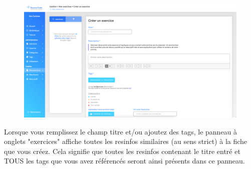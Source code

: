 \begin{figure}[H]
    \includegraphics[width=\textwidth,height=\textheight,keepaspectratio]{images/client/create-exercise.png}
    \centering
\end{figure}

Lorsque vous remplissez le champ titre et/ou ajoutez des tags, le panneau à onglets "exercices" affiche toutes les \glspl{resinfo} similaires (au sens strict) à la \gls{fiche} que vous créez. Cela signifie que toutes les \glspl{resinfo} contenant le titre entré et TOUS les \glspl{tag} que vous avez référencés seront ainsi présents dans ce panneau.

